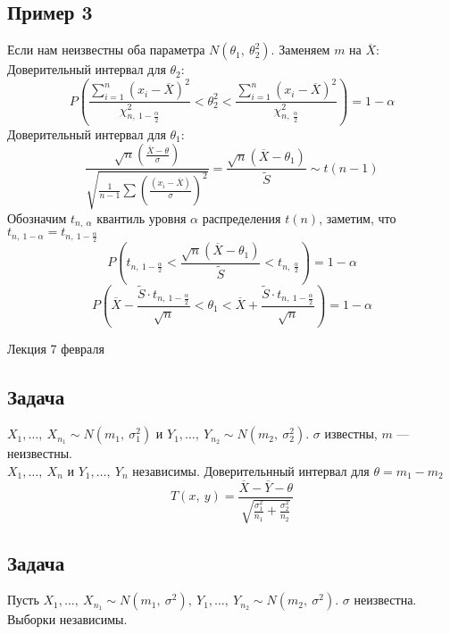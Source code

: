 \documentclass[12pt, a4paper]{article}
\newcommand{\sion}{\sum\limits_{i = 1}^{n}}
\begin{document}
\subsection*{Пример 3}
Если нам неизвестны оба параметра $N(\theta_1,\ \theta_2^2)$. Заменяем $m$ на $\overline{X}$:
Доверительный интервал для $\theta_2$:
\[P\left( \frac{\sion (x_i - \overline{X})^2}{\chi^2_{n,\ 1 - \frac{\alpha}{2}}} < \theta_2^2 < \frac{\sion (x_i - \overline{X})^2}{\chi^2_{n,\ \frac{\alpha}{2}}} \right) = 1 - \alpha\]
Доверительный интервал для $\theta_1$:
\[\frac{\sqrt{n} \left(\frac{\overline{X} - \theta}{\sigma}\right)}{ \sqrt {\frac{1}{n - 1} \sum\left(\frac{(x_i - \overline{X})}{\sigma} \right)^2}} = \frac{\sqrt{n} (\overline{X} - \theta_1)}{\tilde{S}} \sim t(n - 1)\]
Обозначим $t_{n,\ \alpha}$ квантиль уровня $\alpha$ распределения $t(n)$, заметим, что $t_{n,\ 1 - \alpha} = t_{n,\ 1 - \frac{\alpha}{2}}$
\[P(t_{n,\ 1 - \frac{\alpha}{2}} < \frac{\sqrt{n}(\overline{X} - \theta_1)}{\tilde{S}} < t_{n,\ \frac{\alpha}{2}} ) = 1 - \alpha\]
\[P(\overline{X} - \frac{\tilde{S}\cdot t_{n,\ 1 - \frac{\alpha}{2}}}{\sqrt{n}} < \theta_1 < \overline{X} + \frac{\tilde{S}\cdot t_{n,\ 1 - \frac{\alpha}{2}}}{\sqrt{n}} ) = 1 - \alpha\]
\begin{center}
    Лекция 7 февраля
\end{center}
\subsection*{Задача}
$X_1,\dots,\ X_{n_1} \sim N(m_1,\ \sigma_1^2)$ и $Y_1,\dots,\ Y_{n_2} \sim N(m_2,\ \sigma_2^2)$. $\sigma$ известны, $m$ --- неизвестны.\\
$X_1,\dots,\ X_n$ и $Y_1,\dots,\ Y_n$ независимы. Доверительнный интервал для $\theta = m_1 - m_2$
\[T(x,\ y) = \frac{\overline{X} - \overline{Y} - \theta}{\sqrt{\frac{\sigma_1^2}{n_1} + \frac{\sigma_2^2}{n_2}}}\]
\subsection*{Задача}
Пусть $X_1,\dots,\ X_{n_1} \sim N(m_1,\ \sigma^2),\ Y_1,\dots,\ Y_{n_2} \sim N(m_2,\ \sigma^2)$. $\sigma$ неизвестна. Выборки независимы.
\end{document}
